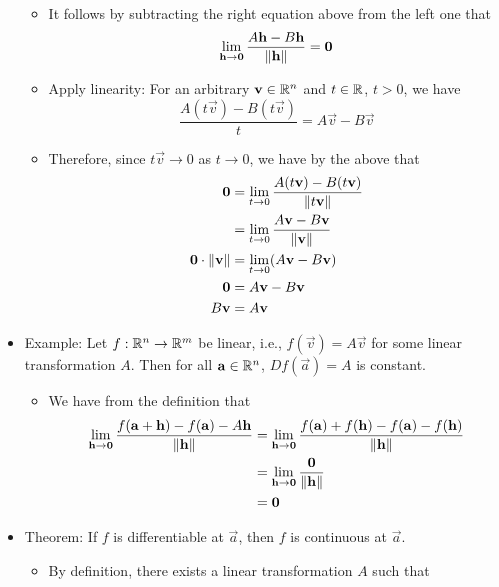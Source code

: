 \documentclass[../notes.tex]{subfiles}
\begin{document}
\begin{itemize}
\begin{itemize}
        \item It follows by subtracting the right equation above from the left one that
        \begin{equation*}
            \lim_{\mathbf{h}\to\bm{0}}\frac{A\mathbf{h}-B\mathbf{h}}{\norm{\mathbf{h}}} = \bm{0}
        \end{equation*}
        \item Apply linearity: For an arbitrary $\mathbf{v}\in\mathbb{R}^n$ and $t\in\mathbb{R}$, $t>0$, we have
        \begin{equation*}
            \frac{A(t\vec{v})-B(t\vec{v})}{t} = A\vec{v}-B\vec{v}
        \end{equation*}
        \item Therefore, since $t\vec{v}\to 0$ as $t\to 0$, we have by the above that
        \begin{align*}
            \bm{0} &= \lim_{t\to 0}\frac{A(t\mathbf{v})-B(t\mathbf{v})}{\norm{t\mathbf{v}}}\\
            &= \lim_{t\to 0}\frac{A\mathbf{v}-B\mathbf{v}}{\norm{\mathbf{v}}}\\
            \bm{0}\cdot\norm{\mathbf{v}} &= \lim_{t\to 0}(A\mathbf{v}-B\mathbf{v})\\
            \bm{0} &= A\mathbf{v}-B\mathbf{v}\\
            B\mathbf{v} &= A\mathbf{v}
        \end{align*}
    \end{itemize}
    \item Example: Let $f:\mathbb{R}^n\to\mathbb{R}^m$ be linear, i.e., $f(\vec{v})=A\vec{v}$ for some linear transformation $A$. Then for all $\mathbf{a}\in\mathbb{R}^n$, $Df(\vec{a})=A$ is constant.
    \begin{itemize}
        \item We have from the definition that
        \begin{align*}
            \lim_{\mathbf{h}\to\bm{0}}\frac{f(\mathbf{a}+\mathbf{h})-f(\mathbf{a})-A\mathbf{h}}{\norm{\mathbf{h}}} &= \lim_{\mathbf{h}\to\bm{0}}\frac{f(\mathbf{a})+f(\mathbf{h})-f(\mathbf{a})-f(\mathbf{h})}{\norm{\mathbf{h}}}\\
            &= \lim_{\mathbf{h}\to\bm{0}}\frac{\bm{0}}{\norm{\mathbf{h}}}\\
            &= \bm{0}
        \end{align*}
    \end{itemize}
    \item Theorem: If $f$ is differentiable at $\vec{a}$, then $f$ is continuous at $\vec{a}$.
    \begin{itemize}
        \item By definition, there exists a linear transformation $A$ such that

\end{itemize}
\end{itemize}
\end{document}
